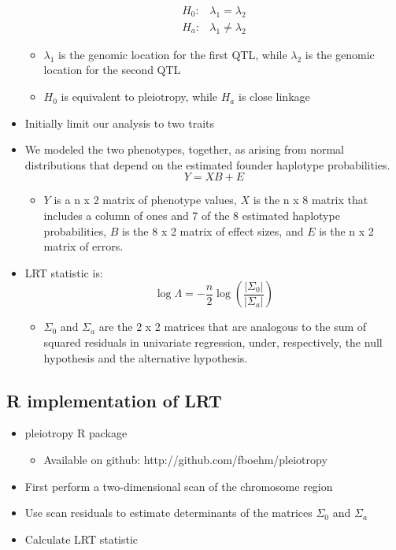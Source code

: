 \documentclass[a0,landscape]{a0poster}
\begin{document}
\begin{multicols}{4}
\begin{itemize}
\begin{eqnarray}
H_0: & \lambda_1 = \lambda_2\nonumber \\
H_a: & \lambda_1 \neq \lambda_2\nonumber
\end{eqnarray}
\begin{itemize}
\item $\lambda_1$ is the genomic location for the first QTL, while $\lambda_2$ is the genomic location for the second QTL
\item $H_0$ is equivalent to pleiotropy, while $H_a$ is close linkage
\end{itemize}
\item Initially limit our analysis to two traits
\item We modeled the two phenotypes, together, as arising from normal distributions that depend on the estimated founder haplotype probabilities.
\begin{equation}
Y = XB + E
\end{equation}
\begin{itemize}
\item $Y$ is a n x 2 matrix of phenotype values, $X$ is the n x 8 matrix that includes a column of ones and 7 of the 8 estimated haplotype probabilities, $B$ is the 8 x 2 matrix of effect sizes, and $E$ is the n x 2 matrix of errors.
\end{itemize}
\item LRT statistic is:
\begin{equation}
\log \Lambda = - \frac{n}{2}\log \left( \frac{|\Sigma_0|}{|\Sigma_a|}\right)
\end{equation}
\begin{itemize}
\item $\Sigma_0$ and $\Sigma_a$ are the 2 x 2 matrices that are analogous to the sum of squared residuals in univariate regression, under, respectively, the null hypothesis and the alternative hypothesis.
\end{itemize}
\end{itemize}

\subsection*{R implementation of LRT}
\begin{itemize}
\item pleiotropy R package \cite{boehm2016pleiotropy}
\begin{itemize}
\item Available on github: http://github.com/fboehm/pleiotropy
\end{itemize}
\item First perform a two-dimensional scan of the chromosome region
\item Use scan residuals to estimate determinants of the matrices $\Sigma_0$ and $\Sigma_a$
\item Calculate LRT statistic
\end{itemize}


\end{multicols}
\end{document}
